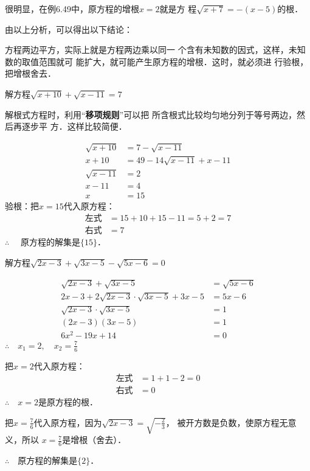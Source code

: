 很明显，在例6.49中，原方程的增根$x=2$就是方
程$\sqrt{x+7}=-(x-5)$的根．

由以上分析，可以得出以下结论：

\begin{blk}{}
    方程两边平方，实际上就是方程两边乘以同一
个含有未知数的因式，这样，未知数的取值范围就可
能扩大，就可能产生原方程的增根．这时，就必须进
行验根，把增根舍去．
\end{blk}



\begin{example}
    解方程$\sqrt{x+10}+\sqrt{x-11}=7$
\end{example}

\begin{analyze}
    解根式方程时，利用“\textbf{移项规则}”可以把
所含根式比较均匀地分列于等号两边，然后再逐步平
方．这样比较简便．
\end{analyze}


\begin{solution}
\begin{align*}
    \sqrt{x+10}&=7-\sqrt{x-11}\tag{移项}\\
x+10&=49-14\sqrt{x-11}+x-11  \tag{两边平方}\\
\sqrt{x-11}&=2\\
x-11&=4 \tag{两边平方}\\
x&=15
\end{align*}
验根：把$x=15$代入原方程：
\[\begin{split}
    \text{左式}&=15+10+15-11=5+2=7\\
    \text{右式}&=7
\end{split}\]
$\therefore\quad $
原方程的解集是$\{15\}$．
\end{solution}

\begin{example}
    解方程$\sqrt{2x-3}+\sqrt{3x-5}-\sqrt{5x-6}=0$
\end{example}

\begin{solution}
\begin{align*}
    \sqrt{2x-3}+\sqrt{3x-5}&=\sqrt{5x-6}  \tag{移项}\\
2x-3+2\sqrt{2x-3}\cdot \sqrt{3x-5}+3x-5&=5x-6  \tag{两边平方}\\
\sqrt{2x-3}\cdot \sqrt{3x-5}&=1\\
(2x-3)(3x-5)&=1   \tag{两边平方}\\
6x^2-19x+14&=0
\end{align*}
$\therefore\quad x_1=2,\quad x_2=\frac{7}{6}$

把$x=2$代入原方程：
\[\begin{split}
    \text{左式}&=1+1-2=0\\
    \text{右式}&=0
\end{split}\]
$\therefore\quad x=2$是原方程的根．

把$x=\frac{7}{6}$代入原方程，因为$\sqrt{2x-3}=\sqrt{-\frac{2}{3}}$，
被开方数是负数，使原方程无意义，所以
$x=\frac{7}{6}$是增根（舍去）．

$\therefore\quad $原方程的解集是$\{2\}$．
\end{solution}

